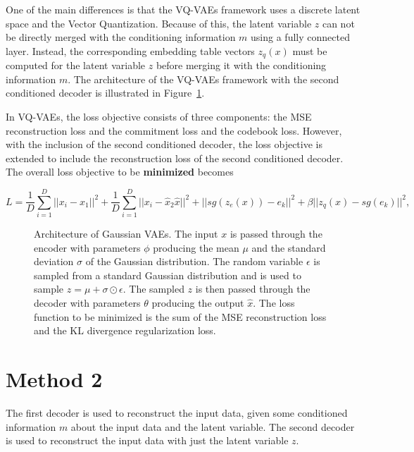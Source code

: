 One of the main differences is that the VQ-VAEs framework uses a discrete latent space and the Vector Quantization. Because of this, the latent variable $z$ can not be directly merged with the conditioning information $m$ using a fully connected layer. Instead, the corresponding embedding table vectors $z_q(x)$ must be computed for the latent variable $z$ before merging it with the conditioning information $m$. The architecture of the VQ-VAEs framework with the second conditioned decoder is illustrated in Figure~\ref{SCVQVAE2DFigure}.

In VQ-VAEs, the loss objective consists of three components: the MSE reconstruction loss and the commitment loss and the codebook loss. However, with the inclusion of the second conditioned decoder, the loss objective is extended to include the reconstruction loss of the second conditioned decoder. The overall loss objective to be \textbf{minimized} becomes

\[ L = \frac{1}{D} \sum_{i=1}^{D} ||x_i - \hat{x}_1 ||^2 + \frac{1}{D} \sum_{i=1}^{D} || x_i - \hat{x}_2 \hat{x} ||^2 + || sg(z_e(x)) - e_k ||^2 + \beta || z_q(x) - sg(e_k) ||^2 , \]





\begin{figure}[H]
    \centering
    
    \caption[Architecture of SCVAE1D.]%
    {
        Architecture of Gaussian VAEs. The input $x$ is passed through the encoder with parameters $\phi$ producing the mean $\mu$ and the standard deviation $\sigma$ of the Gaussian distribution. The random variable $\epsilon$ is sampled from a standard Gaussian distribution and is used to sample $ z = \mu + \sigma \odot \epsilon$. The sampled $z$ is then passed through the decoder with parameters $\theta$ producing the output $\hat{x}$. The loss function to be minimized is the sum of the MSE reconstruction loss and the KL divergence regularization loss.
    }\label{SCVQVAE2DFigure}
\end{figure}

\section{Method 2}

The first decoder is used to reconstruct the input data, given some conditioned
information $m$ about the input data and the latent variable. The second
decoder is used to reconstruct the input data with just the latent variable
$z$.


